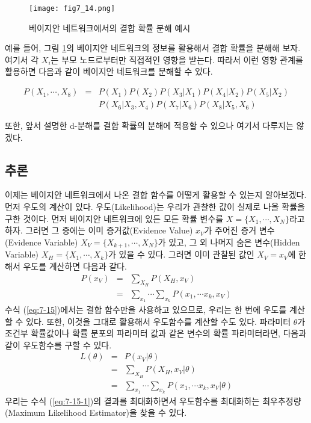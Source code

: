 \documentclass[a4paper]{oblivoir}
\begin{document}
\begin{figure}[ht] \centering 
\texttt{[image: fig7\_14.png]} 
\caption{베이지안 네트워크에서의 결합 확률 분해 예시}
\label{fig:7-14}
\end{figure} 

예를 들어, 그림 \ref{fig:7-14}의 베이지안 네트워크의 정보를 활용해서 결합 확률을 분해해 보자. 여기서 각 $X_i$는 부모 노드로부터만 직접적인 영향을 받는다. 따라서 이런 영향 관계를 활용하면 다음과 같이 베이지안 네트워크를 분해할 수 있다.  

\begin{eqnarray}
P(X_1,\cdots,X_8) & = & P(X_1) P(X_2) P(X_3|X_1) P(X_4|X_2) P(X_5|X_2) \nonumber\\
& & P(X_6|X_3,X_4) P(X_7|X_6) P(X_8|X_5,X_6) \label{eq:7-14-1}
\end{eqnarray}

또한, 앞서 설명한 d-분해를 결합 확률의 분해에 적용할 수 있으나 여기서 다루지는 않겠다. \\


\subsection{추론}

이제는 베이지안 네트워크에서 나온 결합 함수를 어떻게 활용할 수 있는지 알아보겠다. 먼저 우도의 계산이 있다. 우도(Likelihood)는 우리가 관찰한 값이 실제로 나올 확률을 구한 것이다. 먼저 베이지안 네트워크에 있든 모든 확률 변수를 $X=\{X_1, \cdots, X_N\}$라고 하자. 그러면 그 중에는 이미 증거값(Evidence Value) $x_V$가 주어진 증거 변수(Evidence Variable) $X_V=\{X_{k+1}, \cdots, X_N\}$가 있고, 그 외 나머지 숨은 변수(Hidden Variable) $X_H=\{X_1, \cdots, X_k\}$가 있을 수 있다. 그러면 이미 관찰된 값인 $X_V=x_V$에 한해서 우도를 계산하면 다음과 같다. 
\begin{eqnarray}
P(x_V) & = & \sum_{X_{H}} P(X_{H},x_V) \nonumber \\
& = & \sum_{x_{1}} \cdots  \sum_{x_{k}} P(x_{1}, \cdots x_{k}, x_V) \label{eq:7-15}
\end{eqnarray}
수식 (\ref{eq:7-15})에서는 결합 함수만을 사용하고 있으므로, 우리는 한 번에 우도를 계산할 수 있다. 또한, 이것을 그대로 활용해서 우도함수를 계산할 수도 있다. 파라미터 $\theta$가 조건부 확률값이나 확률 분포의 파라미터 값과 같은 변수의 확률 파라미터라면, 다음과 같이 우도함수를 구할 수 있다.
\begin{eqnarray}
L(\theta) & = & P(x_V|\theta) \nonumber \\
& = & \sum_{X_{H}} P(X_{H},x_V|\theta) \nonumber \\
& = & \sum_{x_{1}} \cdots  \sum_{x_{k}} P(x_{1}, \cdots x_{k}, x_V |\theta) \label{eq:7-15-1}
\end{eqnarray}
우리는 수식 (\ref{eq:7-15-1})의 결과를 최대화하면서 우도함수를 최대화하는 최우추정량(Maximum Likelihood Estimator)을 찾을 수 있다. \\
\end{document}
